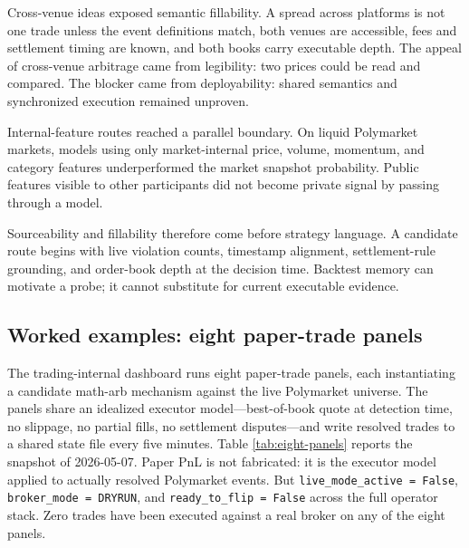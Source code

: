 \documentclass[11pt]{article}
\begin{document}
Cross-venue ideas exposed semantic fillability. A spread across platforms is not one trade unless the event definitions match, both venues are accessible, fees and settlement timing are known, and both books carry executable depth. The appeal of cross-venue arbitrage came from legibility: two prices could be read and compared. The blocker came from deployability: shared semantics and synchronized execution remained unproven.

Internal-feature routes reached a parallel boundary. On liquid Polymarket markets, models using only market-internal price, volume, momentum, and category features underperformed the market snapshot probability. Public features visible to other participants did not become private signal by passing through a model.

Sourceability and fillability therefore come before strategy language. A candidate route begins with live violation counts, timestamp alignment, settlement-rule grounding, and order-book depth at the decision time. Backtest memory can motivate a probe; it cannot substitute for current executable evidence.

\subsection{Worked examples: eight paper-trade panels}

The trading-internal dashboard runs eight paper-trade panels, each instantiating a candidate math-arb mechanism against the live Polymarket universe. The panels share an idealized executor model---best-of-book quote at detection time, no slippage, no partial fills, no settlement disputes---and write resolved trades to a shared state file every five minutes. Table \ref{tab:eight-panels} reports the snapshot of 2026-05-07. Paper PnL is not fabricated: it is the executor model applied to actually resolved Polymarket events. But \texttt{live\_mode\_active = False}, \texttt{broker\_mode = DRYRUN}, and \texttt{ready\_to\_flip = False} across the full operator stack. Zero trades have been executed against a real broker on any of the eight panels.
\end{document}
